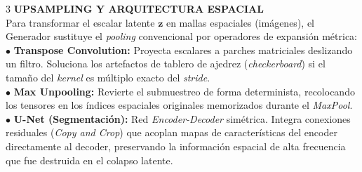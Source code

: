 \documentclass[8pt,a4paper,landscape,fleqn]{extarticle}
\begin{document}
\begin{multicols*}{3}
\textbf{UPSAMPLING Y ARQUITECTURA ESPACIAL}\\
Para transformar el escalar latente $\bm{z}$ en mallas espaciales (imágenes), el Generador sustituye el \textit{pooling} convencional por operadores de expansión métrica:\\
$\bullet$ \textbf{Transpose Convolution:} Proyecta escalares a parches matriciales deslizando un filtro. Soluciona los artefactos de tablero de ajedrez (\textit{checkerboard}) si el tamaño del \textit{kernel} es múltiplo exacto del \textit{stride}.\\
$\bullet$ \textbf{Max Unpooling:} Revierte el submuestreo de forma determinista, recolocando los tensores en los índices espaciales originales memorizados durante el \textit{MaxPool}.\\
$\bullet$ \textbf{U-Net (Segmentación):} Red \textit{Encoder-Decoder} simétrica. Integra conexiones residuales (\textit{Copy and Crop}) que acoplan mapas de características del encoder directamente al decoder, preservando la información espacial de alta frecuencia que fue destruida en el colapso latente.

\vspace{-4mm}
\begin{center}
\end{center}
\end{multicols*}
\end{document}
